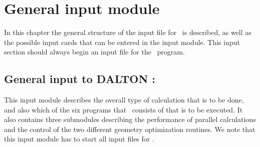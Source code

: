 \chapter{General input module}\label{ch:general}

In this chapter the general structure of the input file for \siraba\
is described, as well as the possible input cards that can be entered in
the \Sec{*DALTON} input module. This input section should always begin an
input file for the \siraba\ program.

\section{General input to DALTON : }\label{sec:general}

This input module describes the overall type of calculation that is to
be done, and also which of the six programs that \siraba\ consists of
that is to be executed. It also contains three submodules describing the
performance of parallel calculations and the control of the two different geometry optimization 
routines. We note that this input module has to start all input files
for \siraba .

